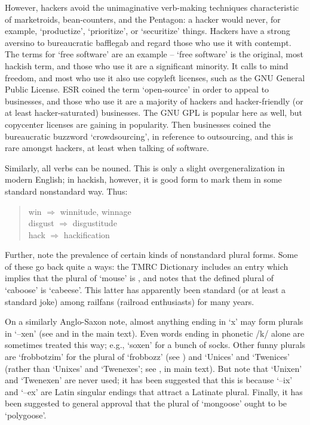 	However, hackers avoid the unimaginative verb-making techniques characteristic of marketroids, bean-counters, and the Pentagon: a
	hacker would never, for example, `productize', `prioritize', or `securitize' things. Hackers have a strong aversino to bureaucratic
	bafflegab and regard those who use it with contempt. The terms for `free software' are an example -- `free software' is the original,
	most hackish term, and those who use it are a significant minority. It calls to mind freedom, and most who use it also use copyleft
	licenses, such as the GNU General Public License. ESR coined the term `open-source' in order to appeal to businesses, and those who use
	it are a majority of hackers and hacker-friendly (or at least hacker-saturated) businesses. The GNU GPL is popular here as well, but
	copycenter licenses are gaining in popularity. Then businesses coined the bureaucratic buzzword `crowdsourcing', in reference to
	outsourcing, and this is rare amongst hackers, at least when talking of software.

	Similarly, all verbs can be nouned. This is only a slight overgeneralization in modern English; in hackish, however, it is good form to
	mark them in some standard nonstandard way. Thus:

	\begin{quote}
		win $\Rightarrow$ winnitude, winnage\\
		disgust $\Rightarrow$ disgustitude\\
		hack $\Rightarrow$ hackification
	\end{quote}

	Further, note the prevalence of certain kinds of nonstandard plural forms. Some of these go back quite a ways: the TMRC Dictionary
	includes an entry which implies that the plural of `mouse' is , and notes that the defined plural of `caboose' is
	`cabeese'. This latter has apparently been standard (or at least a standard joke) among railfans (railroad enthusiasts) for many years.

	On a similarly Anglo-Saxon note, almost anything ending in `x' may form plurals in `--xen' (see  and
	 in the main text). Even words ending in phonetic /k/ alone are sometimes treated this way; e.g., `soxen' for a bunch
	of socks. Other funny plurals are `frobbotzim' for the plural of `frobbozz' (see ) and `Unices' and `Twenices'
	(rather than `Unixes' and `Twenexes'; see ,  in main text). But note that `Unixen' and `Twenexen' are
	never used; it has been suggested that this is because `--ix' and `--ex' are Latin singular endings that attract a Latinate plural.
	Finally, it has been suggested to general approval that the plural of `mongoose' ought to be `polygoose'.

